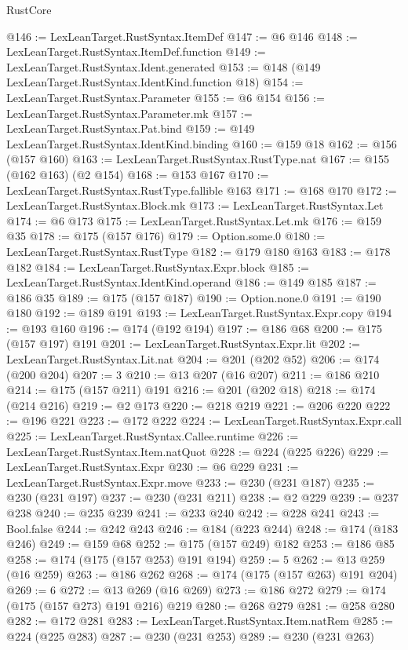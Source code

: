 \begin{lexlean}{RustCore}
\begin{coremodule}
@146 := LexLeanTarget.RustSyntax.ItemDef
@147 := @6 @146
@148 := LexLeanTarget.RustSyntax.ItemDef.function
@149 := LexLeanTarget.RustSyntax.Ident.generated
@153 := @148 (@149 LexLeanTarget.RustSyntax.IdentKind.function @18)
@154 := LexLeanTarget.RustSyntax.Parameter
@155 := @6 @154
@156 := LexLeanTarget.RustSyntax.Parameter.mk
@157 := LexLeanTarget.RustSyntax.Pat.bind
@159 := @149 LexLeanTarget.RustSyntax.IdentKind.binding
@160 := @159 @18
@162 := @156 (@157 @160)
@163 := LexLeanTarget.RustSyntax.RustType.nat
@167 := @155 (@162 @163) (@2 @154)
@168 := @153 @167
@170 := LexLeanTarget.RustSyntax.RustType.fallible @163
@171 := @168 @170
@172 := LexLeanTarget.RustSyntax.Block.mk
@173 := LexLeanTarget.RustSyntax.Let
@174 := @6 @173
@175 := LexLeanTarget.RustSyntax.Let.mk
@176 := @159 @35
@178 := @175 (@157 @176)
@179 := Option.some.{0}
@180 := LexLeanTarget.RustSyntax.RustType
@182 := @179 @180 @163
@183 := @178 @182
@184 := LexLeanTarget.RustSyntax.Expr.block
@185 := LexLeanTarget.RustSyntax.IdentKind.operand
@186 := @149 @185
@187 := @186 @35
@189 := @175 (@157 @187)
@190 := Option.none.{0}
@191 := @190 @180
@192 := @189 @191
@193 := LexLeanTarget.RustSyntax.Expr.copy
@194 := @193 @160
@196 := @174 (@192 @194)
@197 := @186 @68
@200 := @175 (@157 @197) @191
@201 := LexLeanTarget.RustSyntax.Expr.lit
@202 := LexLeanTarget.RustSyntax.Lit.nat
@204 := @201 (@202 @52)
@206 := @174 (@200 @204)
@207 := 3
@210 := @13 @207 (@16 @207)
@211 := @186 @210
@214 := @175 (@157 @211) @191
@216 := @201 (@202 @18)
@218 := @174 (@214 @216)
@219 := @2 @173
@220 := @218 @219
@221 := @206 @220
@222 := @196 @221
@223 := @172 @222
@224 := LexLeanTarget.RustSyntax.Expr.call
@225 := LexLeanTarget.RustSyntax.Callee.runtime
@226 := LexLeanTarget.RustSyntax.Item.natQuot
@228 := @224 (@225 @226)
@229 := LexLeanTarget.RustSyntax.Expr
@230 := @6 @229
@231 := LexLeanTarget.RustSyntax.Expr.move
@233 := @230 (@231 @187)
@235 := @230 (@231 @197)
@237 := @230 (@231 @211)
@238 := @2 @229
@239 := @237 @238
@240 := @235 @239
@241 := @233 @240
@242 := @228 @241
@243 := Bool.false
@244 := @242 @243
@246 := @184 (@223 @244)
@248 := @174 (@183 @246)
@249 := @159 @68
@252 := @175 (@157 @249) @182
@253 := @186 @85
@258 := @174 (@175 (@157 @253) @191 @194)
@259 := 5
@262 := @13 @259 (@16 @259)
@263 := @186 @262
@268 := @174 (@175 (@157 @263) @191 @204)
@269 := 6
@272 := @13 @269 (@16 @269)
@273 := @186 @272
@279 := @174 (@175 (@157 @273) @191 @216) @219
@280 := @268 @279
@281 := @258 @280
@282 := @172 @281
@283 := LexLeanTarget.RustSyntax.Item.natRem
@285 := @224 (@225 @283)
@287 := @230 (@231 @253)
@289 := @230 (@231 @263)

\end{coremodule}
\end{lexlean}
